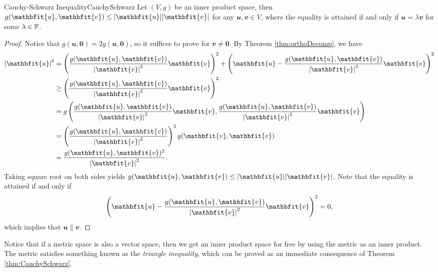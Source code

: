 \documentclass[math]{amznotes}
\theoremstyle{remark}
\newcommand{\zero}{\mathbf{0}}
\begin{document}
\begin{thmbox}{Cauchy-Schwarz Inequality}{CauchySchwarz}
    Let $(V, g)$ be an inner product space, then $g(\mathbfit{u}, \mathbfit{v}) \leq \abs{\mathbfit{u}}\abs{\mathbfit{v}}$ for any $\mathbfit{u}, \mathbfit{v} \in V$, where the equality is attained if and only if $\mathbfit{u} = \lambda\mathbfit{v}$ for some $\lambda \in \mathbb{F}$.
    \tcblower
    \begin{proof}
        Notice that $g(\mathbfit{u}, \zero) = 2g(\mathbfit{u}, \zero)$, so it suffices to prove for $\mathbfit{v} \neq \zero$. By Theorem \ref{thm:orthoDecomp}, we have 
        \begin{align*}
            \abs{\mathbfit{u}}^2 & = \left(\frac{g(\mathbfit{u}, \mathbfit{v})}{\abs{\mathbfit{v}}^2}\mathbfit{v}\right)^2 + \left(\mathbfit{u} - \frac{g(\mathbfit{u}, \mathbfit{v})}{\abs{\mathbfit{v}}^2}\mathbfit{v}\right)^2 \\
            & \geq \left(\frac{g(\mathbfit{u}, \mathbfit{v})}{\abs{\mathbfit{v}}^2}\mathbfit{v}\right)^2 \\
            & = g\left(\frac{g(\mathbfit{u}, \mathbfit{v})}{\abs{\mathbfit{v}}^2}\mathbfit{v}, \frac{g(\mathbfit{u}, \mathbfit{v})}{\abs{\mathbfit{v}}^2}\mathbfit{v}\right) \\
            & = \left(\frac{g(\mathbfit{u}, \mathbfit{v})}{\abs{\mathbfit{v}}^2}\right)^2g(\mathbfit{v}, \mathbfit{v}) \\
            & = \frac{g(\mathbfit{u}, \mathbfit{v})^2}{\abs{\mathbfit{v}}^2}.
        \end{align*}
        Taking square root on both sides yields $g(\mathbfit{u}, \mathbfit{v}) \leq \abs{\mathbfit{u}}\abs{\mathbfit{v}}$. Note that the equality is attained if and only if 
        \begin{equation*}
            \left(\mathbfit{u} - \frac{g(\mathbfit{u}, \mathbfit{v})}{\abs{\mathbfit{v}}^2}\mathbfit{v}\right)^2 = 0,
        \end{equation*}
        which implies that $\mathbfit{u} \parallel \mathbfit{v}$.
    \end{proof}
\end{thmbox}
Notice that if a metric space is also a vector space, then we get an inner product space for free by using the metric as an inner product. The metric satisfies something known as the \textit{triangle inequality}, which can be proved as an immediate consequence of Theorem \ref{thm:CauchySchwarz}.
\end{document}
